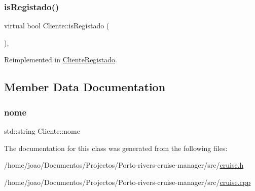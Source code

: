 \subsubsection{\texorpdfstring{is\+Registado()}{isRegistado()}}
{\footnotesize\ttfamily virtual bool Cliente\+::is\+Registado (\begin{DoxyParamCaption}{ }\end{DoxyParamCaption})\hspace{0.3cm}{\ttfamily [inline]}, {\ttfamily [virtual]}}



Reimplemented in \hyperlink{classClienteRegistado_a3dade20423acb0e84c9fbe30c75f0e3e}{Cliente\+Registado}.



\subsection{Member Data Documentation}
\mbox{\label{classCliente_aaa79b0a26f7d5d007fe4ae9696564ca5}} 
\subsubsection{\texorpdfstring{nome}{nome}}
{\footnotesize\ttfamily std\+::string Cliente\+::nome\hspace{0.3cm}{\ttfamily [protected]}}



The documentation for this class was generated from the following files\+:\begin{DoxyCompactItemize}
\item 
/home/joao/\+Documentos/\+Projectos/\+Porto-\/rivers-\/cruise-\/manager/src/\hyperlink{cruise_8h}{cruise.\+h}\item 
/home/joao/\+Documentos/\+Projectos/\+Porto-\/rivers-\/cruise-\/manager/src/\hyperlink{cruise_8cpp}{cruise.\+cpp}\end{DoxyCompactItemize}
